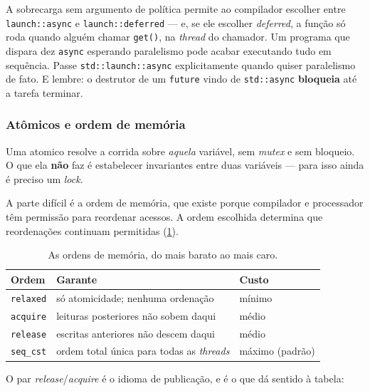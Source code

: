 \begin{armadilha}
A sobrecarga sem argumento de política permite ao compilador escolher entre
\texttt{launch::async} e \texttt{launch::deferred} --- e, se ele escolher
\emph{deferred}, a função só roda quando alguém chamar \texttt{get()}, na
\emph{thread} do chamador. Um programa que dispara dez \texttt{async} esperando
paralelismo pode acabar executando tudo em sequência. Passe
\texttt{std::launch::async} explicitamente quando quiser paralelismo de fato.
E lembre: o destrutor de um \texttt{future} vindo de \texttt{std::async}
\textbf{bloqueia} até a tarefa terminar.
\end{armadilha}

\subsubsection{Atômicos e ordem de memória}

Uma \gls{atomico} resolve a corrida sobre \emph{aquela} variável, sem
\emph{mutex} e sem bloqueio. O que ela \textbf{não} faz é estabelecer
invariantes entre duas variáveis --- para isso ainda é preciso um \emph{lock}.

A parte difícil é a ordem de memória, que existe porque compilador e processador
têm permissão para reordenar acessos. A ordem escolhida determina que
reordenações continuam permitidas (\cref{tab:memory-order}).

\begin{table}[htbp]
\centering
\caption{As ordens de memória, do mais barato ao mais caro.}
\label{tab:memory-order}
\footnotesize
\begin{tabular}{@{}lll@{}}
\toprule
\textbf{Ordem} & \textbf{Garante} & \textbf{Custo} \\
\midrule
\texttt{relaxed} & só atomicidade; nenhuma ordenação      & mínimo \\
\texttt{acquire} & leituras posteriores não sobem daqui   & médio \\
\texttt{release} & escritas anteriores não descem daqui   & médio \\
\texttt{seq\_cst}& ordem total única para todas as \emph{threads} & máximo (padrão) \\
\bottomrule
\end{tabular}
\end{table}

O par \emph{release}/\emph{acquire} é o idioma de publicação, e é o que dá
sentido à tabela:

